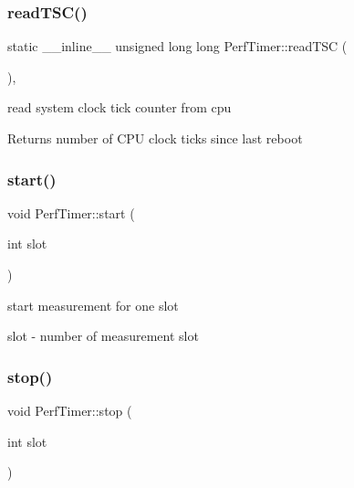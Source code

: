 \subsubsection{\texorpdfstring{read\+T\+S\+C()}{readTSC()}}
{\footnotesize\ttfamily static \+\_\+\+\_\+inline\+\_\+\+\_\+ unsigned long long Perf\+Timer\+::read\+T\+SC (\begin{DoxyParamCaption}{ }\end{DoxyParamCaption})\hspace{0.3cm}{\ttfamily [inline]}, {\ttfamily [static]}}



read system clock tick counter from cpu 

\begin{DoxyReturn}{Returns}
number of C\+PU clock ticks since last reboot 
\end{DoxyReturn}
\mbox{\label{classPerfTimer_a5ffdaeb63f13089d49c6be96c8d82304}} 
\subsubsection{\texorpdfstring{start()}{start()}}
{\footnotesize\ttfamily void Perf\+Timer\+::start (\begin{DoxyParamCaption}\item[{int}]{slot }\end{DoxyParamCaption})}



start measurement for one slot 

\begin{DoxyItemize}
\item {\ttfamily slot} -\/ number of measurement slot \end{DoxyItemize}
\mbox{\label{classPerfTimer_afaad955880deb107074bf3f477528aa9}} 
\subsubsection{\texorpdfstring{stop()}{stop()}}
{\footnotesize\ttfamily void Perf\+Timer\+::stop (\begin{DoxyParamCaption}\item[{int}]{slot }\end{DoxyParamCaption})}



